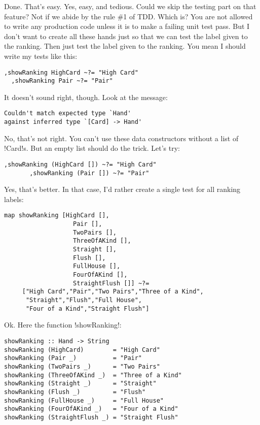 \success Done. That's easy.
\lhN Yes, easy, and tedious. Could we skip the testing part on that feature?
\lhA Not if we abide by the rule \#1 of TDD.
\lhN Which is?
\lhA You are not allowed to write any production code unless it is to make a failing unit test pass.
\lhN But I don't want to create all these hands just so that we can test the label given to the ranking.
\lhA Then just test the label given to the ranking.
\lhN You mean I should write my tests like this:
\begin{lstlisting}[frame=single]
  ,showRanking HighCard ~?= "High Card"
  ,showRanking Pair ~?= "Pair"
\end{lstlisting}
It doesn't sound right, though. Look at the message:
\begin{small}
\begin{verbatim}
Couldn't match expected type `Hand'
against inferred type `[Card] -> Hand'
\end{verbatim}
\end{small}
\lhA \error No, that's not right. You can't use these data constructors without a list of \il!Card!s.
But an empty list should do the trick.
\lhN Let's try:
\begin{lstlisting}[frame=single]
       ,showRanking (HighCard []) ~?= "High Card"
       ,showRanking (Pair []) ~?= "Pair"
\end{lstlisting}
\lhA \success Yes, that's better.
\lhN In that case, I'd rather create a single test for all ranking labels:
\begin{lstlisting}[frame=single]
map showRanking [HighCard [],
                   Pair [],
                   TwoPairs [],
                   ThreeOfAKind [],
                   Straight [],
                   Flush [],
                   FullHouse [],
                   FourOfAKind [],
                   StraightFlush []] ~?=
     ["High Card","Pair","Two Pairs","Three of a Kind",
      "Straight","Flush","Full House",
      "Four of a Kind","Straight Flush"]
\end{lstlisting}
\lhA Ok. Here the function \il!showRanking!:
\begin{lstlisting}[frame=single]
showRanking :: Hand -> String
showRanking (HighCard)        = "High Card"
showRanking (Pair _)          = "Pair" 
showRanking (TwoPairs _)      = "Two Pairs" 
showRanking (ThreeOfAKind _)  = "Three of a Kind" 
showRanking (Straight _)      = "Straight" 
showRanking (Flush _)         = "Flush" 
showRanking (FullHouse _)     = "Full House" 
showRanking (FourOfAKind _)   = "Four of a Kind"
showRanking (StraightFlush _) = "Straight Flush"
\end{lstlisting}
